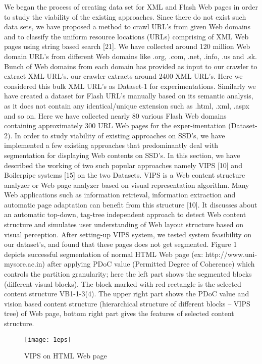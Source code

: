 \documentclass[fleqn,twoside]{article}
\begin{document}
We began the process of creating data set for XML and Flash Web pages in order to study the viability of the existing approaches. Since there do not exist such data sets, we have proposed a method to crawl URL's from given Web domains and to classify the uniform resource locations (URLs) comprising of XML Web pages using string based search [21]. We have collected around 120 million Web domain URL's from different Web domains like .org, .com, .net, .info, .us and .sk. Bunch of Web domains from each domain has provided as input to our crawler to extract XML URL's. our crawler extracts around 2400 XML URL's. Here we considered this bulk XML URL's as Dataset-1 for experimentations. Similarly we have created a dataset for Flash URL's manually based on its semantic analysis, as it does not contain any identical/unique extension such as .html, .xml, .aspx and so on. Here we have collected nearly 80 various Flash Web domains containing approximately 300 URL Web pages for the exper-imentation (Dataset-2).
\vskip 2mm
In order to study viability of existing approaches on SSD's, we have implemented a few existing approaches that predominantly deal with segmentation for displaying Web contents on SSD's. In this section, we have described the working of two such popular approaches namely VIPS [10] and Boilerpipe systems [15] on the two Datasets. 
\vskip 2mm
VIPS is a Web content structure analyzer or Web page analyzer based on visual representation algorithm. Many Web applications such as information retrieval, information extraction and automatic page adaptation can benefit from this structure [10]. It discusses about an automatic top-down, tag-tree independent approach to detect Web content structure and simulates user understanding of Web layout structure based on visual perception. After setting-up VIPS system, we tested system feasibility on our dataset's, and found that these pages does not get segmented. Figure 1 depicts successful segmentation of normal HTML Web page (ex: http://www.uni-mysore.ac.in) after applying PDoC value (Permitted Degree of Coherence) which controls the partition granularity; here the left part shows the segmented blocks (different visual blocks). The block marked with red rectangle is the selected content structure VB1-1-3(4). The upper right part shows the PDoC value and vision based content structure (hierarchical structure of different blocks – VIPS tree) of Web page, bottom right part gives the features of selected content structure. 

\begin{figure*}[!ht]
\centering
\texttt{[image: 1eps]}\\
\caption{VIPS on HTML Web page}
\end{figure*}
\end{document}
